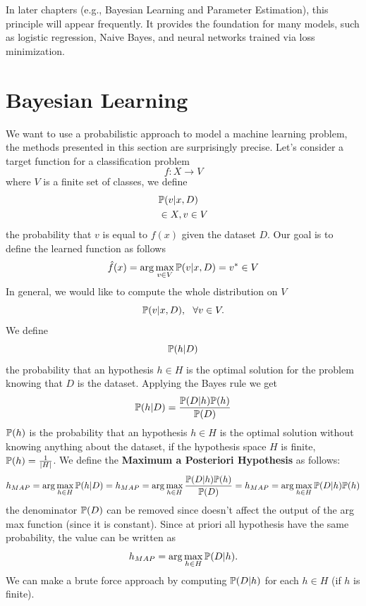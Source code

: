 \documentclass[10pt, letterpaper]{report}
\begin{document}
\bigskip
In later chapters (e.g., Bayesian Learning and Parameter Estimation), this principle will appear frequently.  
It provides the foundation for many models, such as logistic regression, Naive Bayes, and neural networks trained via loss minimization.


\bigskip
\section{Bayesian Learning}
We want to use a probabilistic approach to model a machine learning problem, the methods presented in this section are surprisingly precise. Let's consider a target function for a classification problem\begin{equation}
	f:X\rightarrow V
\end{equation}
where $V$ is a finite set of classes, we define \begin{align}
	 & {\mathbb P}(v|x,D) \\ &\in X, v\in V
\end{align}
the probability that $v$ is equal to $f(x)$ given the dataset $D$. Our goal is to define the learned function as follows\begin{equation}
	\hat f(x)=\arg\max_{v\in V}{\mathbb P}(v|x,D)=v^*\in V
\end{equation}
In general, we would like to compute the whole distribution on $V$\begin{equation}
	{\mathbb P}(v|x,D), \ \ \forall v\in V.
\end{equation}
We define\begin{equation}
	{\mathbb P}(h|D)
\end{equation}
the probability that an hypothesis $h\in H$ is the optimal solution for the problem knowing that $D$ is the dataset. Applying the Bayes rule we get\begin{equation}
	{\mathbb P}(h|D)=\frac{{\mathbb P}(D|h){\mathbb P}(h)}{{\mathbb P}(D)}
\end{equation}
${\mathbb P}(h)$ is the probability that an hypothesis $h\in H$ is the optimal solution without knowing anything about the dataset, if the hypothesis space  $H$ is finite, ${\mathbb P}(h)=\frac{1}{|H|}$. We define the \textbf{Maximum a Posteriori Hypothesis} as follows:\begin{equation}
	h_{MAP}=\arg\max_{h\in H}{\mathbb P}(h|D)= h_{MAP}=\arg\max_{h\in H}\frac{{\mathbb P}(D|h){\mathbb P}(h)}{{\mathbb P}(D)}= h_{MAP}=\arg\max_{h\in H}{\mathbb P}(D|h){\mathbb P}(h)
\end{equation}
the denominator ${\mathbb P}(D)$ can be removed since doesn't affect the output of the arg max function (since it is constant). Since at priori all hypothesis have the same probability, the value can be written as\begin{equation}
	h_{MAP}=\arg\max_{h\in H}{\mathbb P}(D|h).
\end{equation}
We can make a brute force approach by computing ${\mathbb P}(D|h)$ for each $h\in H$ (if $h$ is finite).
\end{document}
